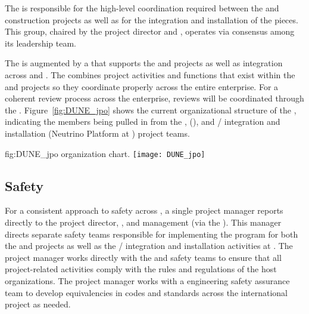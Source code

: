 The  is responsible for the high-level
coordination required between the  and  construction 
projects as well as for the integration and 
installation of the  pieces. This group, chaired by the  project director and ,  operates via  
consensus among its leadership team. 

The  is augmented by a  that supports the
 and  projects as well as integration
across  and . The  
combines project activities and functions that exist within the 
 and  projects so they  
 coordinate properly across the entire enterprise.    
For a coherent review process across the 
 enterprise, reviews will be coordinated 
through the . 
Figure~\ref{fig:DUNE_jpo} shows the current organizational 
structure of the , indicating the members being 
pulled in from the ,  (), and 
/ integration and installation (Neutrino Platform at ) 
project teams.

\begin{dunefigure}{fig:DUNE_jpo}
  { organization chart.}
  \texttt{[image: DUNE\_jpo]}
\end{dunefigure}


\subsection{Safety}
\label{sec:dune_safety}


For a consistent approach to safety across ,
a single project  manager reports directly 
to the  project director, , and 
management (via the  ).  This manager
directs separate safety teams responsible for implementing the 
  program for both the  
and  projects as well as the /
integration and installation activities at .  The 
project  manager works directly with the  
and  safety teams to ensure that all project-related 
activities comply with the rules and regulations of the host 
organizations.  The project  manager works with a  
engineering safety assurance team to develop
equivalencies in codes and standards across the international project
as needed.

